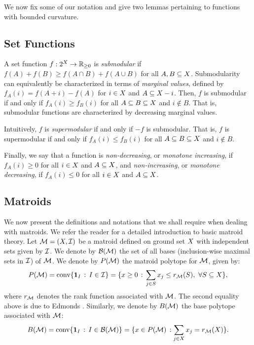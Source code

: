 \documentclass{article}
\newcommand{\reals}{\ensuremath{\mathbb{R}}}
\newcommand{\posreals}{\ensuremath{\reals_{\ge 0}}}
\theoremstyle{definition}
\begin{document}
We now fix some of our notation and give two lemmas pertaining to functions with bounded curvature.

\subsection{Set Functions}
A set function $f : 2^\ground \to \posreals$ is \emph{submodular} if $f(A) + f(B) \ge f(A \cap B) + f(A \cup B)$ for all $A, B\subseteq X$.  Submodularity can equivalently be characterized in terms of \emph{marginal values}, defined by $f_{A}(i) = f(A + i) - f(A)$ for $i \in X$ and $A \subseteq X - i$.  Then, $f$ is submodular if and only if $f_A(i) \ge f_B(i)$ for all $A \subseteq B \subseteq X$ and $i \not\in B$.    That is, submodular functions are characterized by decreasing marginal values.  

Intuitively, $f$ is \emph{supermodular} if and only if $-f$ is submodular.  That is, $f$ is supermodular if and only if $f_{A}(i) \le f_{B}(i)$ for all $A \subseteq B \subseteq X$ and $i \not \in B$.

Finally, we say that a function is \emph{non-decreasing}, or \emph{monotone increasing}, if $f_A(i) \ge 0$ for all $i \in X$ and $A \subseteq X$, and \emph{non-increasing}, or \emph{monotone decreasing}, if $f_A(i) \le 0$ for all $i \in X$ and $A \subseteq X$. 

\subsection{Matroids}
\label{sec:matroids}
We now present the definitions and notations that we shall require when dealing with matroids.  We refer the reader \cite{Schrijver2003} for a detailed introduction to basic matroid theory.  Let $\mathcal{M}=(X,\mathcal{I})$ be a matroid defined on ground set $X$ with independent sets given by $\mathcal{I}$.  We denote by $\mathcal{B}(\mathcal{M})$ the set of all bases (inclusion-wise maximal sets in $\mathcal{I}$) of $\mathcal{M}$.  We denote by $P(\mathcal{M})$ the matroid polytope for $\mathcal{M}$, given by:
\begin{equation*}
P(\mathcal{M}) = \mathrm{conv} \{ \mathbf{1}_{I}\,:\,I \in \mathcal{I} \} 
= \{ x \ge 0\,:\,\sum_{j \in S} x_{j} \le r_{\mathcal{M}}(S),\ \forall S \subseteq X \},
\end{equation*}
where $r_{\mathcal{M}}$ denotes the rank function associated with $\mathcal{M}$.
The second equality above is due to Edmonds \cite{Edmonds1971}.  Similarly, we denote by $B(\mathcal{M})$ the base polytope associated with $\mathcal{M}$:
\begin{equation*}
B(\mathcal{M}) = \mathrm{conv} \{ \mathbf{1}_{I}\,:\,I \in \mathcal{B}(\mathcal{M}) \} = \{ x \in P(\mathcal{M})\,: \sum_{j \in X}x_{j} = r_{\mathcal{M}}(X) \}.
\end{equation*}
\end{document}
